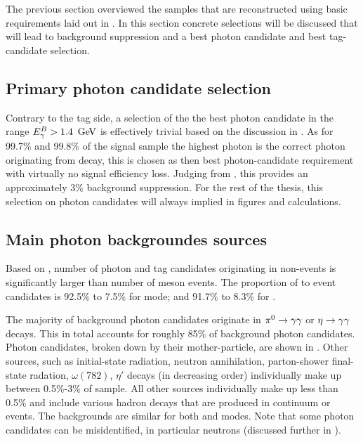 The previous section overviewed the samples that are reconstructed using basic requirements laid out in .
In this section concrete selections will be discussed that will lead to background suppression and a best photon candidate
and best tag-candidate selection.

\subsection{Primary photon candidate selection}\label{sec:primary_photon_candidate_selection}
Contrary to the tag side, a selection of the the best photon candidate in the range ${E^B_{\gamma}}>1.4~\mathrm{\,Ge\kern -0.1em V}$ is effectively trivial based on the discussion in .
As for 99.7\% and 99.8\% of the signal \MC sample the highest \EB photon is the correct photon originating from \BtoXsgamma decay,
this is chosen as then best photon-candidate requirement with virtually no signal efficiency loss.
Judging from , this provides an approximately 3\% background suppression.
For the rest of the thesis, this selection on photon candidates will always implied in figures and calculations.
\subsection{Main photon backgroundes sources}\label{sec:main_background_sources}

Based on , number of photon and tag candidates originating 
in non-\BB events is significantly larger than number of \B meson events.
The proportion of \qqbar to \BB event candidates is 92.5\% to 7.5\% for \FEI \Bp mode;
and 91.7\% to 8.3\% for \FEI \Bz.

The majority of background photon candidates originate in $\pi^0\rightarrow\gamma\gamma$ or $\eta\rightarrow\gamma\gamma$ decays.
This in total accounts for roughly 85\% of background photon candidates.
Photon candidates, broken down by their mother-particle, are shown in .
Other sources, such as initial-state radiation, neutron annihilation, parton-shower final-state radation, $\omega(782)$, $\eta'$ decays (in decreasing order) individually make up between 0.5\%-3\% of sample.
All other sources individually make up less than 0.5\% and include various hadron decays that are produced in continuum or \B events.
The backgrounds are similar for both \FEI \Bp and \Bz modes.
Note that some photon candidates can be misidentified, in particular neutrons (discussed further in ).


